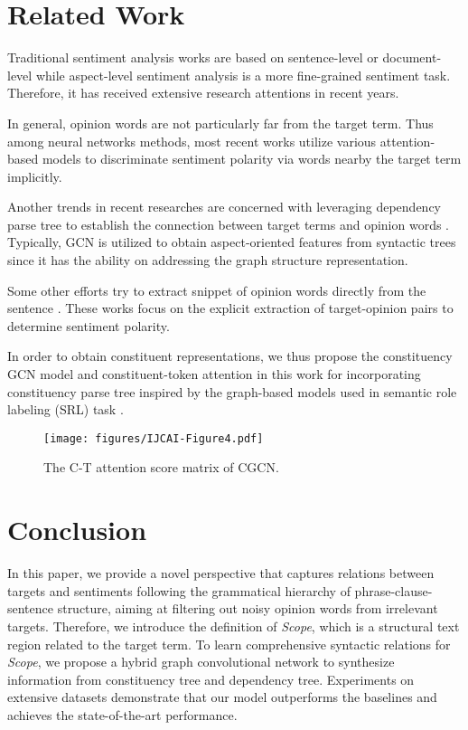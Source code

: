 \documentclass{article}
\begin{document}
\section{Related Work}

Traditional sentiment analysis works are based on sentence-level or document-level while aspect-level sentiment analysis is a more fine-grained sentiment task.  Therefore, it has received extensive research attentions in recent years.

In general, opinion words are not particularly far from the target term. Thus among neural networks methods, most recent works utilize various attention-based models \cite{wang2016attention,huang2018aspect,fan2018multi} to discriminate sentiment polarity via words nearby the target term implicitly.

Another trends in recent researches are concerned with leveraging dependency parse tree to establish the connection between target terms and opinion words \cite{tang2020dependency}. Typically, GCN is utilized to obtain aspect-oriented features from syntactic trees \cite{zhang2019aspect,sun2019aspect,zhang2020convolution,rui2021dual,liang2020jointly,wang2020relational,tang2020dependency} since it has the ability on addressing the graph structure representation.

Some other efforts try to extract snippet of opinion words directly from the sentence \cite{wang2018learning,xu2020aspect}. These works focus on the explicit extraction of target-opinion pairs to determine sentiment polarity.

In order to obtain constituent representations, we thus propose the constituency GCN model and constituent-token attention in this work for incorporating constituency parse tree  inspired by the graph-based models used in semantic role labeling (SRL) task \cite{marcheggiani2020graph}.

\begin{figure}[t]
	\centering
	\texttt{[image: figures/IJCAI-Figure4.pdf]} 
	\caption{The C-T attention score matrix of CGCN.}
	\label{fig4}
\end{figure}

\section{Conclusion}

In this paper, we provide a novel perspective that captures relations between targets and sentiments following the grammatical hierarchy of phrase-clause-sentence structure, aiming at filtering out noisy opinion words from irrelevant targets. Therefore, we introduce the definition of \emph{Scope}, which is a structural text region related to the target term. To learn comprehensive syntactic relations for \emph{Scope}, we propose a hybrid graph convolutional network to synthesize information from constituency tree and dependency tree. Experiments on extensive datasets demonstrate that our model outperforms the baselines and achieves the state-of-the-art performance.
\end{document}
